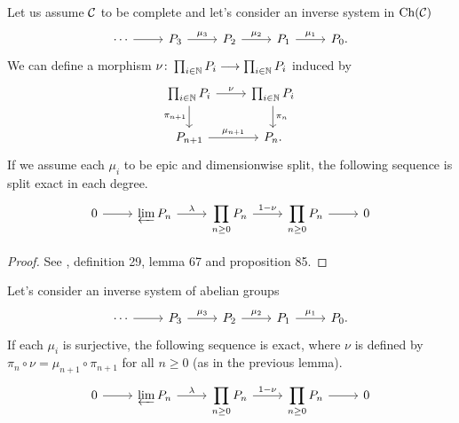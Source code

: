 \begin{lemma}
    \label{lem:inv-limit-chain}
    Let us assume $\mathcal{C}$ to be complete and let's consider an inverse system in $\mathrm{Ch}(\mathcal{C})$
    \[\begin{tikzcd}
        \cdots & {P_3} & {P_2} & {P_1} & {P_0.}
        \arrow[from=1-1, to=1-2]
        \arrow["{\mu_3}", from=1-2, to=1-3]
        \arrow["{\mu_2}", from=1-3, to=1-4]
        \arrow["{\mu_1}", from=1-4, to=1-5]
    \end{tikzcd}\]
    We can define a morphism $\nu \colon \prod_{i \in \mathbb{N}} P_i \longrightarrow \prod_{i \in \mathbb{N}} P_i$ induced by 
    \[\begin{tikzcd}
        {\prod_{i \in \N} P_i} & {\prod_{i \in \N} P_i} \\
        {P_{n+1}} & {P_n.}
        \arrow["\nu", from=1-1, to=1-2]
        \arrow["{\pi_{n+1}}"', from=1-1, to=2-1]
        \arrow["{\pi_n}", from=1-2, to=2-2]
        \arrow["{\mu_{n+1}}", from=2-1, to=2-2]
    \end{tikzcd}\]
    If we assume each $\mu_i$ to be epic and dimensionwise split, the following sequence is split exact in each degree.
    \[\begin{tikzcd}
    0 
    \arrow[r] 
    & \varprojlim P_n 
    \arrow[r, "\lambda"] 
    & \displaystyle\prod_{n \geq 0} P_n 
    \arrow[r, "1-\nu"] 
    & \displaystyle\prod_{n \geq 0} P_n 
    \arrow[r] 
    & 0
  \end{tikzcd}\]
\end{lemma}

\begin{proof}
    See \cite{MurfetDerived}, definition 29, lemma 67 and proposition 85.
\end{proof}

\begin{lemma}
    \label{lem:inv-limit-group}
    Let's consider an inverse system of abelian groups
    \[\begin{tikzcd}
        \cdots & {P_3} & {P_2} & {P_1} & {P_0.}
        \arrow[from=1-1, to=1-2]
        \arrow["{\mu_3}", from=1-2, to=1-3]
        \arrow["{\mu_2}", from=1-3, to=1-4]
        \arrow["{\mu_1}", from=1-4, to=1-5]
    \end{tikzcd}\]
    If each $\mu_i$ is surjective, the following sequence is exact, where $\nu$ is defined by $\pi_n \circ \nu = \mu_{n+1} \circ \pi_{n+1}$ for all $n \geq 0$ (as in the previous lemma).
    \[\begin{tikzcd}
    0 
    \arrow[r] 
    & \varprojlim P_n 
    \arrow[r, "\lambda"] 
    & \displaystyle\prod_{n \geq 0} P_n 
    \arrow[r, "1-\nu"] 
    & \displaystyle\prod_{n \geq 0} P_n 
    \arrow[r] 
    & 0
  \end{tikzcd}\]
\end{lemma}

